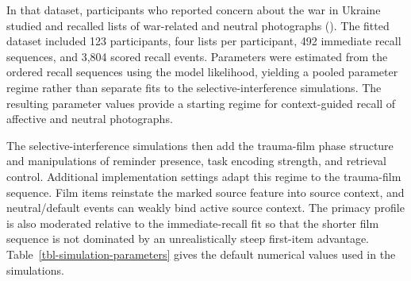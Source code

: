 \documentclass[
  man,
  floatsintext,
  longtable,
  nolmodern,
  notxfonts,
  notimes,
  draftfirst,
  colorlinks=true,linkcolor=blue,citecolor=blue,urlcolor=blue]{apa7}
\begin{document}
In that dataset, participants who reported concern about the war in
Ukraine studied and recalled lists of war-related and neutral
photographs (). The fitted dataset included 123 participants, four lists per
participant, 492 immediate recall sequences, and 3,804 scored recall
events. Parameters were estimated from the ordered recall sequences
using the model likelihood, yielding a pooled parameter regime rather
than separate fits to the selective-interference simulations. The
resulting parameter values provide a starting regime for context-guided
recall of affective and neutral photographs.

The selective-interference simulations then add the trauma-film phase
structure and manipulations of reminder presence, task encoding
strength, and retrieval control. Additional implementation settings
adapt this regime to the trauma-film sequence. Film items reinstate the
marked source feature into source context, and neutral/default events
can weakly bind active source context. The primacy profile is also
moderated relative to the immediate-recall fit so that the shorter film
sequence is not dominated by an unrealistically steep first-item
advantage. Table~\ref{tbl-simulation-parameters} gives the default
numerical values used in the simulations.
\end{document}
